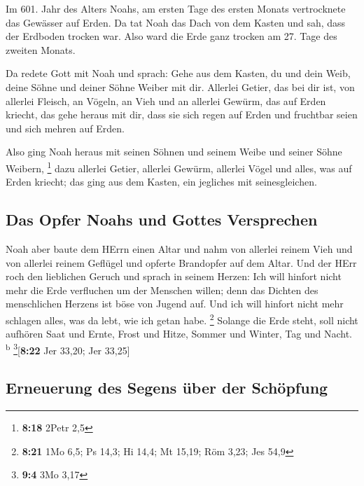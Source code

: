  Im 601. Jahr des Alters Noahs, am ersten Tage des ersten
Monats vertrocknete das Gewässer auf Erden. Da tat Noah das Dach von dem
Kasten und sah, dass der Erdboden trocken war.  Also ward
die Erde ganz trocken am 27. Tage des zweiten Monats.

 Da redete Gott mit Noah und sprach:  Gehe
aus dem Kasten, du und dein Weib, deine Söhne und deiner Söhne Weiber
mit dir.  Allerlei Getier, das bei dir ist, von allerlei
Fleisch, an Vögeln, an Vieh und an allerlei Gewürm, das auf Erden
kriecht, das gehe heraus mit dir, dass sie sich regen auf Erden und
fruchtbar seien und sich mehren auf Erden.

 Also ging Noah heraus mit seinen Söhnen und seinem Weibe
und seiner Söhne Weibern, \footnote{\textbf{8:18} 2Petr 2,5}
 dazu allerlei Getier, allerlei Gewürm, allerlei Vögel
und alles, was auf Erden kriecht; das ging aus dem Kasten, ein jegliches
mit seinesgleichen.

\hypertarget{das-opfer-noahs-und-gottes-versprechen}{%
\subsection{Das Opfer Noahs und Gottes
Versprechen}\label{das-opfer-noahs-und-gottes-versprechen}}

 Noah aber baute dem HErrn einen Altar und nahm von
allerlei reinem Vieh und von allerlei reinem Geflügel und opferte
Brandopfer auf dem Altar.  Und der HErr roch den
lieblichen Geruch und sprach in seinem Herzen: Ich will hinfort nicht
mehr die Erde verfluchen um der Menschen willen; denn das Dichten des
menschlichen Herzens ist böse von Jugend auf. Und ich will hinfort nicht
mehr schlagen alles, was da lebt, wie ich getan habe. \footnote{\textbf{8:21}
  1Mo 6,5; Ps 14,3; Hi 14,4; Mt 15,19; Röm 3,23; Jes 54,9}
 Solange die Erde steht, soll nicht aufhören Saat und
Ernte, Frost und Hitze, Sommer und Winter, Tag und Nacht.
\textsuperscript{b} \footnote{\textbf{9:4} 3Mo 3,17}{[}\textbf{8:22} Jer
33,20; Jer 33,25{]}

\hypertarget{erneuerung-des-segens-uxfcber-der-schuxf6pfung}{%
\subsection{Erneuerung des Segens über der
Schöpfung}\label{erneuerung-des-segens-uxfcber-der-schuxf6pfung}}

